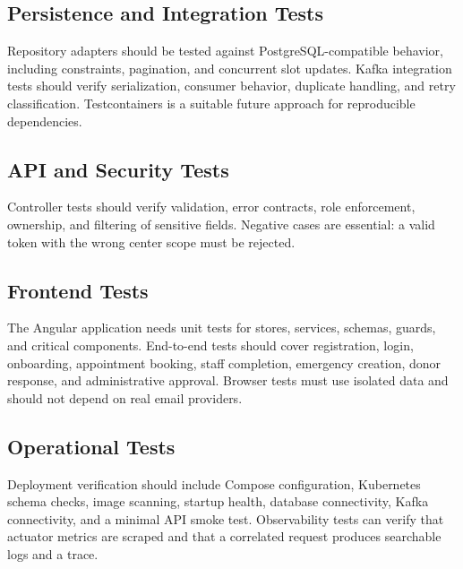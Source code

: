 \subsection{Persistence and Integration Tests}
Repository adapters should be tested against PostgreSQL-compatible behavior, including constraints, pagination, and concurrent slot updates. Kafka integration tests should verify serialization, consumer behavior, duplicate handling, and retry classification. Testcontainers is a suitable future approach for reproducible dependencies.

\subsection{API and Security Tests}
Controller tests should verify validation, error contracts, role enforcement, ownership, and filtering of sensitive fields. Negative cases are essential: a valid token with the wrong center scope must be rejected.

\subsection{Frontend Tests}
The Angular application needs unit tests for stores, services, schemas, guards, and critical components. End-to-end tests should cover registration, login, onboarding, appointment booking, staff completion, emergency creation, donor response, and administrative approval. Browser tests must use isolated data and should not depend on real email providers.

\subsection{Operational Tests}
Deployment verification should include Compose configuration, Kubernetes schema checks, image scanning, startup health, database connectivity, Kafka connectivity, and a minimal API smoke test. Observability tests can verify that actuator metrics are scraped and that a correlated request produces searchable logs and a trace.

